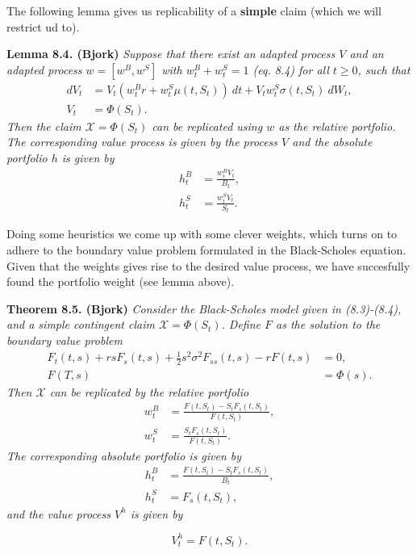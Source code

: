 \documentclass[a4paper,12pt,openany]{book}
\begin{document}
The following lemma gives us replicability of a \textbf{simple} claim (which we will restrict ud to).

\textbf{Lemma 8.4. (Bjork)} \emph{Suppose that there exist an adapted process \(V\) and an adapted process \(w=[w^B,w^S]\) with \(w^B_t+w^S_t=1\) (eq. 8.4) for all \(t\ge 0\), such that}
\begin{align*}
dV_t&=V_t(w_t^Br+w_t^S\mu(t,S_t))\ dt+V_tw_t^S\sigma(t,S_t)\ dW_t,\tag{8.5}\\
V_t&=\Phi(S_t).\tag{8.5}
\end{align*}
\emph{Then the claim \(\mathcal{X}=\Phi(S_t)\) can be replicated using \(w\) as the relative portfolio. The corresponding value process is given by the process \(V\) and the absolute portfolio \(h\) is given by}
\begin{align*}
h_t^B&=\frac{w_t^B V_t}{B_t},\tag{8.6}\\
h_t^S&=\frac{w_t^S V_t}{S_t}.\tag{8.7}
\end{align*}

Doing some heuristics we come up with some clever weights, which turns on to adhere to the boundary value problem formulated in the Black-Scholes equation. Given that the weights gives rise to the desired value process, we have succesfully found the portfolio weight (see lemma above).

\textbf{Theorem 8.5. (Bjork)} \emph{Consider the Black-Scholes model given in (8.3)-(8.4), and a simple contingent claim \(\mathcal{X}=\Phi(S_t)\). Define \(F\) as the solution to the boundary value problem}
\begin{align*}
F_t(t,s)+rsF_s(t,s)+\frac{1}{2}s^2\sigma^2F_{ss}(t,s)-rF(t,s)&=0,\tag{8.17}\\
F(T,s)&=\Phi(s).\tag{8.17}
\end{align*}
\emph{Then \(\mathcal{X}\) can be replicated by the relative portfolio}
\begin{align*}
w_t^B&=\frac{F(t,S_t)-S_tF_s(t,S_t)}{F(t,S_t)},\tag{8.18}\\
w_t^S&=\frac{S_tF_s(t,S_t)}{F(t,S_t)}.\tag{8.19}
\end{align*}
\emph{The corresponding absolute portfolio is given by}
\begin{align*}
h_t^B&=\frac{F(t,S_t)-S_tF_s(t,S_t)}{B_t},\tag{8.20}\\
h_t^S&=F_s(t,S_t),\tag{8.21}
\end{align*}
\emph{and the value process \(V^h\) is given by}

\[
V^h_t=F(t,S_t).\tag{8.22}
\]
\end{document}
